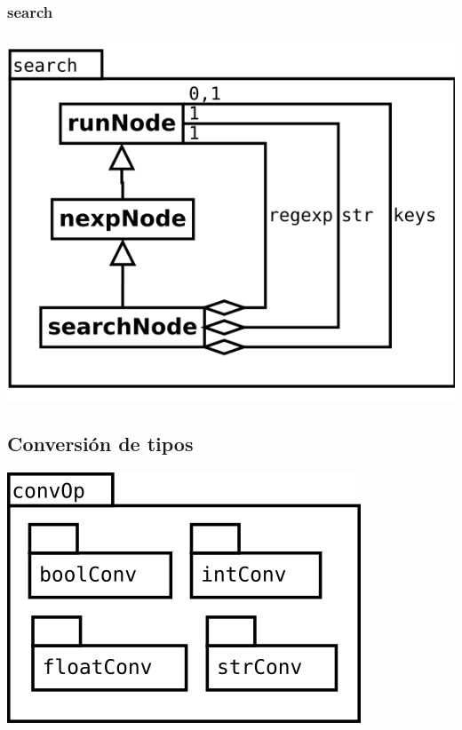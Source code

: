 \subsubsection {search}
\begin{center}
\includegraphics[scale=0.4]{search.png} \\
\end{center}

\pagebreak
\subsection {Conversión de tipos}
\begin{center}
\includegraphics[scale=0.4]{convOp-package.png} \\
\end{center}

